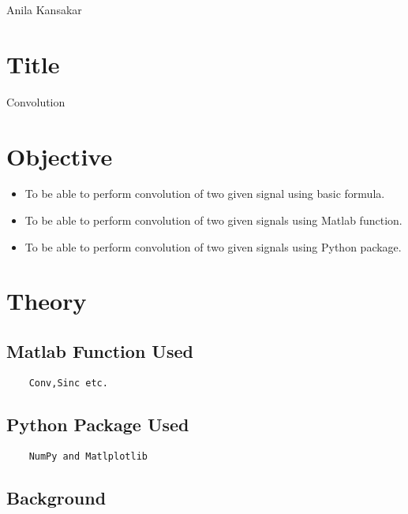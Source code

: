 \documentclass[a4paper,11pt]{article}
\begin{document}
{Anila  Kansakar}

\renewcommand{\contentsname}{Table of Contents}
\tableofcontents

\pagebreak
\lstlistoflistings
\vspace{10em}
\listoffigures
\pagebreak
{}

\section{Title} {\large Convolution}
\section{Objective}
\begin {itemize}
\item To be able to perform convolution of two given signal using basic formula.
\item To be able to perform convolution of two given signals using Matlab function.
\item To be able to perform convolution of two given signals using Python package.

\end{itemize}


\section{Theory}

\subsection {Matlab Function Used}
\begin{verbatim}
    Conv,Sinc etc.
\end{verbatim}

\subsection {Python Package Used}
\begin{verbatim}
    NumPy and Matlplotlib
\end{verbatim}

\subsection{Background}
\end{document}
